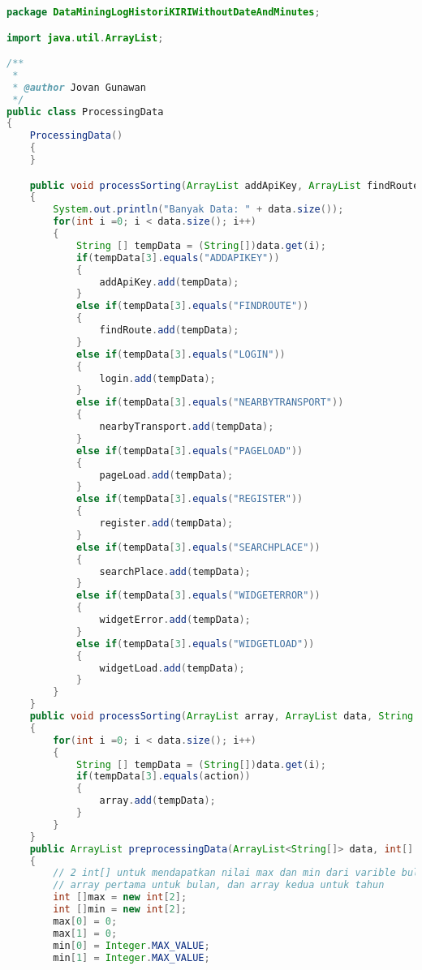 \begin{lstlisting}[language=Java,basicstyle=\tiny,caption=ProcessingData.java]
package DataMiningLogHistoriKIRIWithoutDateAndMinutes;

import java.util.ArrayList;

/**
 *
 * @author Jovan Gunawan
 */
public class ProcessingData
{
    ProcessingData()
    {
    }

    public void processSorting(ArrayList addApiKey, ArrayList findRoute, ArrayList login, ArrayList nearbyTransport, ArrayList pageLoad, ArrayList register, ArrayList searchPlace, ArrayList widgetError, ArrayList widgetLoad, ArrayList data)
    {
        System.out.println("Banyak Data: " + data.size());
        for(int i =0; i < data.size(); i++)
        {
            String [] tempData = (String[])data.get(i);
            if(tempData[3].equals("ADDAPIKEY"))
            {
                addApiKey.add(tempData);
            }
            else if(tempData[3].equals("FINDROUTE"))
            {
                findRoute.add(tempData);
            }
            else if(tempData[3].equals("LOGIN"))
            {
                login.add(tempData);
            }
            else if(tempData[3].equals("NEARBYTRANSPORT"))
            {
                nearbyTransport.add(tempData);
            }
            else if(tempData[3].equals("PAGELOAD"))
            {
                pageLoad.add(tempData);
            }
            else if(tempData[3].equals("REGISTER"))
            {
                register.add(tempData);
            }
            else if(tempData[3].equals("SEARCHPLACE"))
            {
                searchPlace.add(tempData);
            }
            else if(tempData[3].equals("WIDGETERROR"))
            {
                widgetError.add(tempData);
            }
            else if(tempData[3].equals("WIDGETLOAD"))
            {
                widgetLoad.add(tempData);
            }
        }
    }
    public void processSorting(ArrayList array, ArrayList data, String action)
    {
        for(int i =0; i < data.size(); i++)
        {
            String [] tempData = (String[])data.get(i);
            if(tempData[3].equals(action))
            {
                array.add(tempData);
            }
        }
    }
    public ArrayList preprocessingData(ArrayList<String[]> data, int[] maxMin)
    {
        // 2 int[] untuk mendapatkan nilai max dan min dari varible bulan dan tahun yang digunakan untuk inisialisasi max min pada kelas SDForExtractData.
        // array pertama untuk bulan, dan array kedua untuk tahun
        int []max = new int[2];
        int []min = new int[2];
        max[0] = 0;
        max[1] = 0;
        min[0] = Integer.MAX_VALUE;
        min[1] = Integer.MAX_VALUE;
        

\end{lstlisting}
